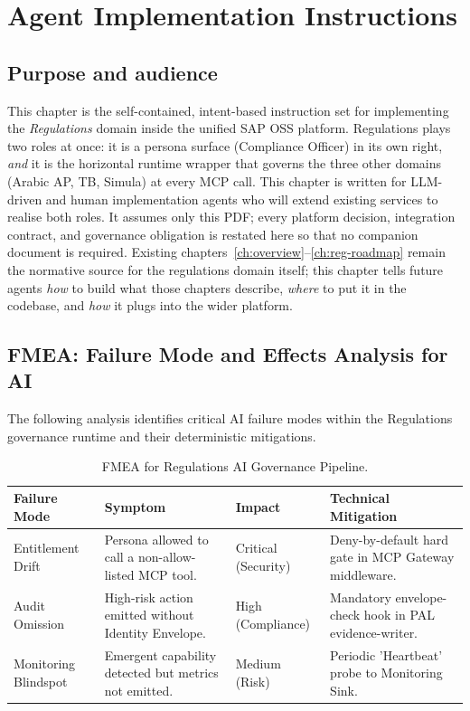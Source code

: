 \chapter{Agent Implementation Instructions}\label{ch:agent-impl}

\section{Purpose and audience}
This chapter is the self-contained, intent-based instruction set for
implementing the \emph{Regulations} domain inside the unified SAP
OSS platform. Regulations plays two roles at once: it is a persona
surface (Compliance Officer) in its own right, \emph{and} it is the
horizontal runtime wrapper that governs the three other domains
(Arabic AP, TB, Simula) at every MCP call. This chapter is written
for LLM-driven and human implementation agents who will extend
existing services to realise both roles. It assumes only this PDF;
every platform decision, integration contract, and governance
obligation is restated here so that no companion document is
required. Existing chapters~\ref{ch:overview}--\ref{ch:reg-roadmap}
remain the normative source for the regulations domain itself; this
chapter tells future agents \emph{how} to build what those chapters
describe, \emph{where} to put it in the codebase, and \emph{how} it
plugs into the wider platform.



\section{FMEA: Failure Mode and Effects Analysis for AI}
\label{sec:fmea-ai}

The following analysis identifies critical AI failure modes within the Regulations governance runtime and their deterministic mitigations.

\begin{table}[htbp]
\centering
\footnotesize
\caption{FMEA for Regulations AI Governance Pipeline.}
\label{tab:reg-fmea}
\begin{tabularx}{\textwidth}{@{}l X X X@{}}
\toprule
\textbf{Failure Mode} & \textbf{Symptom} & \textbf{Impact} & \textbf{Technical Mitigation} \\
\midrule
Entitlement Drift & Persona allowed to call a non-allow-listed MCP tool. & Critical (Security) & Deny-by-default hard gate in MCP Gateway middleware. \\
Audit Omission & High-risk action emitted without Identity Envelope. & High (Compliance) & Mandatory envelope-check hook in PAL evidence-writer. \\
Monitoring Blindspot & Emergent capability detected but metrics not emitted. & Medium (Risk) & Periodic 'Heartbeat' probe to Monitoring Sink. \\
\bottomrule
\end{tabularx}
\end{table}

